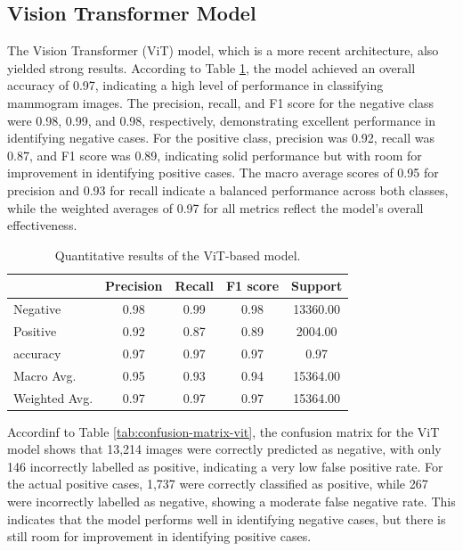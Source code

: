 \documentclass[../main]{subfiles}
\begin{document}
\subsection{Vision Transformer Model}
The Vision Transformer (ViT) model, which is a more recent architecture, also yielded strong results. According to Table \ref{tab:quantitative-results-vit}, the model achieved an overall accuracy of 0.97, indicating a high level of performance in classifying mammogram images. The precision, recall, and F1 score for the negative class were 0.98, 0.99, and 0.98, respectively, demonstrating excellent performance in identifying negative cases. For the positive class, precision was 0.92, recall was 0.87, and F1 score was 0.89, indicating solid performance but with room for improvement in identifying positive cases. The macro average scores of 0.95 for precision and 0.93 for recall indicate a balanced performance across both classes, while the weighted averages of 0.97 for all metrics reflect the model's overall effectiveness.

\begin{table}[h!]
    \centering
    \begin{tabular}{|l|c|c|c|c|}
        \hline
         & Precision & Recall & F1 score & Support \\ \hline
        Negative & 0.98 & 0.99 & 0.98 & 13360.00 \\ \hline
        Positive & 0.92 & 0.87 & 0.89 & 2004.00 \\ \hline
        accuracy & 0.97 & 0.97 & 0.97 & 0.97 \\ \hline
        Macro Avg. & 0.95 & 0.93 & 0.94 & 15364.00 \\ \hline
        Weighted Avg. & 0.97 & 0.97 & 0.97 & 15364.00 \\ \hline
    \end{tabular}
    \caption{Quantitative results of the ViT-based model.}
    \label{tab:quantitative-results-vit}
\end{table}

\noindent Accordinf to Table \ref{tab:confusion-matrix-vit}, the confusion matrix for the ViT model shows that 13,214 images were correctly predicted as negative, with only 146 incorrectly labelled as positive, indicating a very low false positive rate. For the actual positive cases, 1,737 were correctly classified as positive, while 267 were incorrectly labelled as negative, showing a moderate false negative rate. This indicates that the model performs well in identifying negative cases, but there is still room for improvement in identifying positive cases.
\end{document}
